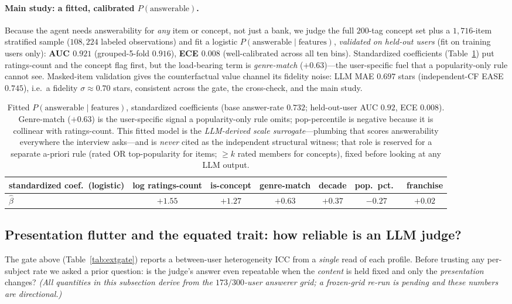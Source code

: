 \documentclass[11pt]{article}
\begin{document}
\paragraph{Main study: a fitted, calibrated $P(\text{answerable})$.} Because the agent needs answerability for
\emph{any} item or concept, not just a bank, we judge the full $200$-tag concept set plus a $1{,}716$-item
stratified sample ($108{,}224$ labeled observations) and fit a logistic $P(\text{answerable}\mid\text{features})$,
\emph{validated on held-out users} (fit on training users only): \textbf{AUC $0.921$} (grouped-5-fold $0.916$),
\textbf{ECE $0.008$} (well-calibrated across all ten bins). Standardized coefficients (Table~\ref{tab:extcoef})
put ratings-count and the concept flag first, but the load-bearing term is \emph{genre-match} ($+0.63$)---the
user-specific fuel that a popularity-only rule cannot see. Masked-item validation gives the counterfactual value
channel its fidelity noise: LLM MAE $0.697$ stars (independent-CF EASE $0.745$), i.e.\ a fidelity $\sigma\approx0.70$
stars, consistent across the gate, the cross-check, and the main study.

\begin{table}[h]\centering\small
\begin{tabular}{lccccc c}
\toprule
standardized coef.\ (logistic) & log ratings-count & is-concept & genre-match & decade & pop.\ pct.\ & franchise\\
\midrule
$\hat\beta$ & $+1.55$ & $+1.27$ & $\mathbf{+0.63}$ & $+0.37$ & $-0.27$ & $+0.02$\\
\bottomrule
\end{tabular}
\caption{Fitted $P(\text{answerable}\mid\text{features})$, standardized coefficients (base answer-rate $0.732$;
held-out-user AUC $0.92$, ECE $0.008$). Genre-match ($+0.63$) is the user-specific signal a popularity-only rule
omits; pop-percentile is negative because it is collinear with ratings-count. This fitted model is the
\emph{LLM-derived scale surrogate}---plumbing that scores answerability everywhere the interview asks---and is
\emph{never} cited as the independent structural witness; that role is reserved for a separate a-priori rule
(rated OR top-popularity for items; $\ge k$ rated members for concepts), fixed before looking at any LLM output.}
\label{tab:extcoef}
\end{table}

\subsection{Presentation flutter and the equated trait: how reliable is an LLM judge?}\label{sec:flutter}
The gate above (Table~\ref{tab:extgate}) reports a between-user heterogeneity ICC from a \emph{single} read of each
profile. Before trusting any per-subject rate we asked a prior question: is the judge's answer even repeatable when
the \emph{content} is held fixed and only the \emph{presentation} changes? \emph{(All quantities in this subsection
derive from the $173/300$-user answerer grid; a frozen-grid re-run is pending and these numbers are directional.)}
\end{document}
